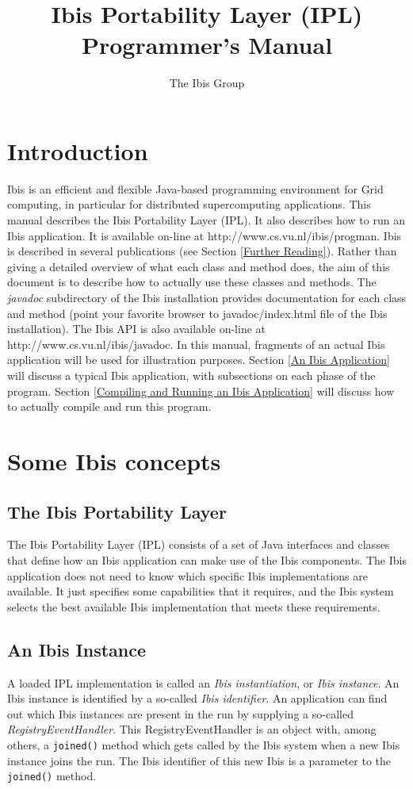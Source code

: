 \documentclass[10pt]{article}
\newcommand{\mysection}[1]{\section{#1}\label{#1}}
\newcommand{\mysubsection}[1]{\subsection{#1}\label{#1}}
\begin{document}
\title{Ibis Portability Layer (IPL) Programmer's Manual}

\author{The Ibis Group}

\maketitle

\section{Introduction}

Ibis is an efficient and flexible Java-based programming environment for Grid
computing, in particular for distributed supercomputing applications.
This manual describes the Ibis Portability Layer (IPL). It also describes
how to run an Ibis application.
It is available on-line at http://www.cs.vu.nl/ibis/progman.
Ibis is described in several publications (see Section \ref{Further Reading}).
Rather than giving a detailed overview of what each class and method does,
the aim of this document is to describe how to actually use these classes
and methods.
The \emph{javadoc} subdirectory of the Ibis installation provides
documentation for each class and method (point your favorite browser
to javadoc/index.html file of the Ibis installation).
The Ibis API is also available
on-line at http://www.cs.vu.nl/ibis/javadoc.
In this manual, fragments of an actual Ibis application will be used for
illustration purposes.
Section \ref{An Ibis Application} will discuss a typical Ibis application,
with subsections on each phase of the program.
Section \ref{Compiling and Running an Ibis Application} will discuss how to
actually compile and run this program.

\mysection{Some Ibis concepts}

\mysubsection{The Ibis Portability Layer}

The Ibis Portability Layer (IPL) consists of a set of Java interfaces and
classes that define how an Ibis application can make use of the Ibis components.
The Ibis application does not need to know which specific Ibis implementations
are available.
It just specifies some capabilities that it requires, and the Ibis system
selects the best available Ibis implementation that meets these requirements.
 
\mysubsection{An Ibis Instance}

A loaded IPL implementation is called an \emph{Ibis instantiation}, or 
\emph{Ibis instance}.
An Ibis instance is identified by a so-called
\emph{Ibis identifier}.
An application can find out which Ibis instances are present in the run
by supplying a so-called \emph{RegistryEventHandler}.
This RegistryEventHandler is an object with, among others, a \texttt{joined()}
method which gets called by the Ibis system when a new Ibis instance
joins the run.  The Ibis identifier of this new Ibis is a parameter
to the \texttt{joined()} method.
\end{document}
